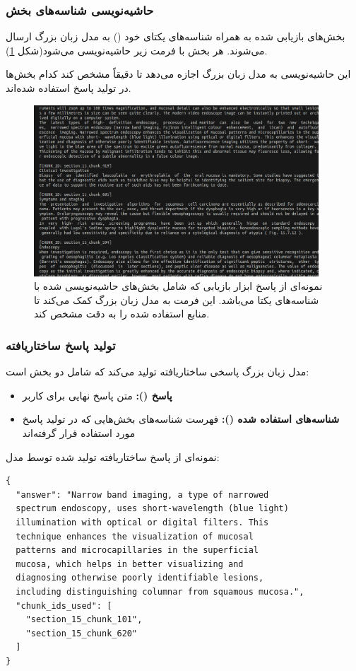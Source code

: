 \subsubsection*{حاشیه‌نویسی شناسه‌های بخش}
بخش‌های بازیابی شده به همراه شناسه‌های یکتای خود () به مدل زبان بزرگ ارسال می‌شوند. هر بخش با فرمت زیر حاشیه‌نویسی می‌شود(شکل \ref{fig:tool_response}).

این حاشیه‌نویسی به مدل زبان بزرگ اجازه می‌دهد تا دقیقاً مشخص کند کدام بخش‌ها در تولید پاسخ استفاده شده‌اند.

\begin{figure}[!htbp]
    \centering
    \includegraphics[width=0.95\textwidth]{tool_response.png}
    \caption{نمونه‌ای از پاسخ ابزار بازیابی که شامل بخش‌های حاشیه‌نویسی شده با شناسه‌های یکتا می‌باشد. این فرمت به مدل زبان بزرگ کمک می‌کند تا منابع استفاده شده را به دقت مشخص کند.}
    \label{fig:tool_response}
\end{figure}

\subsubsection*{تولید پاسخ ساختاریافته}
مدل زبان بزرگ پاسخی ساختاریافته تولید می‌کند که شامل دو بخش است:

\begin{itemize}
    \item \textbf{پاسخ ():} متن پاسخ نهایی برای کاربر
    \item \textbf{شناسه‌های استفاده شده ():} فهرست شناسه‌های بخش‌هایی که در تولید پاسخ مورد استفاده قرار گرفته‌اند
\end{itemize}

\noindent
نمونه‌ای از پاسخ ساختاریافته تولید شده توسط مدل:

\begin{latin}
\begin{verbatim}
{
  "answer": "Narrow band imaging, a type of narrowed 
  spectrum endoscopy, uses short-wavelength (blue light) 
  illumination with optical or digital filters. This 
  technique enhances the visualization of mucosal 
  patterns and microcapillaries in the superficial 
  mucosa, which helps in better visualizing and 
  diagnosing otherwise poorly identifiable lesions, 
  including distinguishing columnar from squamous mucosa.",
  "chunk_ids_used": [
    "section_15_chunk_101", 
    "section_15_chunk_620"
  ]
}
\end{verbatim}
\end{latin}

